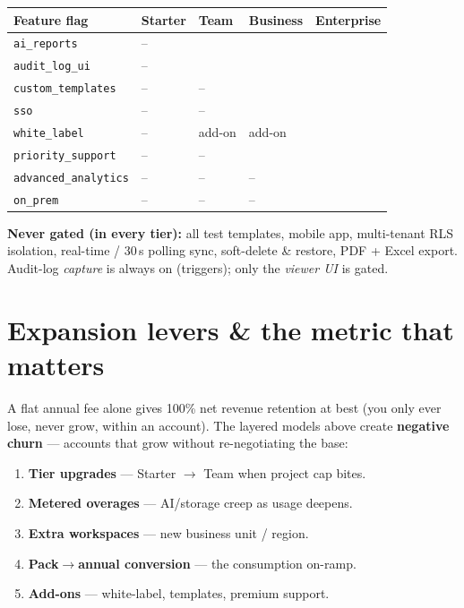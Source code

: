 \documentclass[11pt,a4paper]{article}
\newcommand{\tild}{\raisebox{0.17ex}{$\scriptstyle\sim$}}
\newcommand{\flag}[1]{\texttt{#1}}
\newcommand{\yes}{\textcolor{mgreen}{\checkmark}}
\newcommand{\no}{\textcolor{mgrey}{--}}
\begin{document}
\begin{center}
\begin{tabular}{@{}L{4.6cm} C{1.8cm} C{1.8cm} C{1.9cm} C{2.2cm}@{}}
  \toprule
  \textbf{Feature flag} & \textbf{Starter} & \textbf{Team} & \textbf{Business} & \textbf{Enterprise} \\
  \midrule
  \flag{ai\_reports}        & \no  & \yes & \yes & \yes \\
  \flag{audit\_log\_ui}     & \no  & \yes & \yes & \yes \\
  \flag{custom\_templates}  & \no  & \no  & \yes & \yes \\
  \flag{sso}                & \no  & \no  & \yes & \yes \\
  \flag{white\_label}       & \no  & add-on & add-on & \yes \\
  \flag{priority\_support}  & \no  & \no  & \yes & \yes \\
  \flag{advanced\_analytics}& \no  & \no  & \no  & \yes \\
  \flag{on\_prem}           & \no  & \no  & \no  & \yes \\
  \bottomrule
\end{tabular}
\end{center}

\noindent\textbf{Never gated (in every tier):} all test templates, mobile app,
multi-tenant RLS isolation, real-time / 30\,s polling sync, soft-delete \& restore,
PDF + Excel export. Audit-log \emph{capture} is always on (triggers); only the
\emph{viewer UI} is gated.

\section{Expansion levers \& the metric that matters}

A flat annual fee alone gives \tild{}100\% net revenue retention at best (you
only ever lose, never grow, within an account). The layered models above create
\textbf{negative churn} --- accounts that grow without re-negotiating the base:

\begin{enumerate}[noitemsep, leftmargin=1.6em]
  \item \textbf{Tier upgrades} --- Starter $\rightarrow$ Team when project cap bites.
  \item \textbf{Metered overages} --- AI/storage creep as usage deepens.
  \item \textbf{Extra workspaces} --- new business unit / region.
  \item \textbf{Pack$\rightarrow$annual conversion} --- the consumption on-ramp.
  \item \textbf{Add-ons} --- white-label, templates, premium support.
\end{enumerate}
\end{document}
